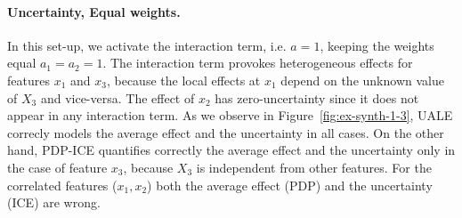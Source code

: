 \documentclass[twoside]{article}
\begin{document}
\paragraph{Uncertainty, Equal weights.}

In this set-up, we activate the interaction term, i.e.  \(a=1\),
keeping the weights equal \(a_1=a_2=1\). The interaction term provokes
heterogeneous effects for features \(x_1\) and \(x_3\), because the
local effects at \(x_1\) depend on the unknown value of \(X_3\) and
vice-versa. The effect of \(x_2\) has zero-uncertainty since it does
not appear in any interaction term.  As we observe in
Figure~\ref{fig:ex-synth-1-3}, UALE correcly models the average effect
and the uncertainty in all cases.  On the other hand, PDP-ICE
quantifies correctly the average effect and the uncertainty only in
the case of feature \(x_3\), because \(X_3\) is independent from other
features. For the correlated features (\(x_1, x_2\)) both the average
effect (PDP) and the uncertainty (ICE) are wrong.
\end{document}
